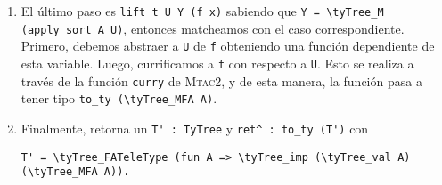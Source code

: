 \begin{enumerate}
    Esto nos es útil porque ahora podemos generar un valor \lstinline{x : X'}en \lift, donde \lstinline{X'} es \lstinline{MTele_val (MTele_In \Type_sort F)}.
    Es decir que \lstinline{x} es una variable del tipo resultante de liftear \lstinline{X}, el lado izquierdo de la implicación. Lo que resta es tomar nuestra función \lstinline{f} de tipo \lstinline{X' -> Y} y liftearla. Esto signfica liftear \lstinline{f x}.
    \item El último paso es \lstinline{lift t U Y (f x)} sabiendo que \lstinline{Y = \tyTree_M (apply_sort A U)}, entonces matcheamos con el caso correspondiente. Primero, debemos abstraer a \lstinline{U} de \lstinline{f} obteniendo una función dependiente de esta variable.
    Luego, currificamos a \lstinline{f} con respecto a \lstinline{U}. Esto se realiza a través de la función \lstinline{curry} de \textsc{Mtac2}, y de esta manera, la función pasa a tener tipo \lstinline{to_ty (\tyTree_MFA A)}.
    \item Finalmente, \lift retorna un \lstinline{T' : TyTree} y \lstinline{ret^ : to_ty (T')} con
    \begin{lstlisting}
T' = \tyTree_FATeleType (fun A => \tyTree_imp (\tyTree_val A) (\tyTree_MFA A)).
    \end{lstlisting}
\end{enumerate}
